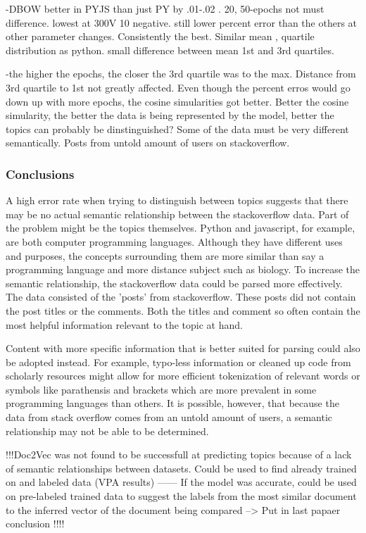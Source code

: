 -DBOW better in PYJS than just PY by .01-.02 . 20, 50-epochs not must difference. lowest at 300V 10 negative. still lower percent error than the others at other parameter changes. Consistently the best. Similar mean , quartile distribution as python. small difference between mean 1st and 3rd quartiles.


-the higher the epochs, the closer the 3rd quartile was to the max. Distance from 3rd quartile to 1st not greatly affected. Even though the percent erros would go down up with more epochs, the cosine simularities got better. Better the cosine simularity, the better the data is being represented by the model, better the topics can probably be dinstinguished? Some of the data must be very different semantically. Posts from untold amount of users on stackoverflow. 





 


\subsubsection{Conclusions}
A high error rate when trying to distinguish between topics suggests that there may be no actual semantic relationship between the stackoverflow data. Part of the problem might be the topics themselves. Python and javascript, for example, are both computer programming languages. Although they have different uses and purposes, the concepts surrounding them are more similar than say a programming language and more distance subject such as biology. To increase the semantic relationship, the stackoverflow data could be parsed more effectively. The data consisted of the 'posts' from stackoverflow. These posts did not contain the post titles or the comments. Both the titles and comment so often contain the most helpful information relevant to the topic at hand. 

Content with more specific information that is better suited for parsing could also be adopted instead. For example, typo-less information or cleaned up code from scholarly resources might allow for more efficient tokenization of relevant words or symbols like parathensis and brackets which are more prevalent in some programming languages than others. It is possible, however, that because the data from stack overflow comes from an untold amount of users, a semantic relationship may not be able to be determined. 

!!!Doc2Vec was not found to be successfull at predicting topics because of a lack of semantic relationships between datasets. Could be used to find already trained on and labeled data (VPA results) ------ If the model was accurate, could be used on pre-labeled trained data to suggest the labels from the most similar document to the inferred vector of the document being compared  --> Put in last papaer conclusion !!!!

